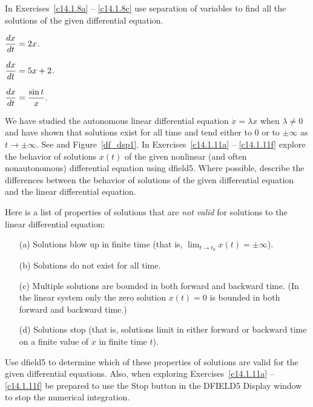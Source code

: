 \documentclass{ximera}
\begin{document}
\noindent In Exercises~\ref{c14.1.8a} -- \ref{c14.1.8c} use separation 
of variables to find all the solutions of the given differential equation.
\begin{exercise}  \label{c14.1.8a}
$\displaystyle \frac{dx}{dt} = 2x$.
\end{exercise}
\begin{exercise}  \label{c14.1.8b}
$\displaystyle \frac{dx}{dt} = 5x+2$.
\end{exercise}
\begin{exercise}  \label{c14.1.8c}
$\displaystyle \frac{dx}{dt} = \frac{\sin t}{x}$.
\end{exercise}

\CEXER

\noindent We have studied the autonomous linear differential equation 
$\dot{x}=\lambda x$ when $\lambda\neq 0$ and have shown that solutions 
exist for all time and tend either to $0$ or to $\pm\infty$ as $t\to\pm\infty$.
See  and Figure~\ref{df_dsp1}.  In Exercises~\ref{c14.1.11a} -- 
\ref{c14.1.11f} explore the behavior of solutions $x(t)$ of the given 
nonlinear (and often nonautonomous) differential equation using {\sf dfield5}.  
Where possible, describe the differences between the behavior of solutions of 
the given differential equation and the linear differential equation.  

  Here is a list of properties of solutions that are 
{\em not valid\/} for solutions to the linear differential equation:
\begin{itemize}
\item[(a)]  Solutions blow up in finite time (that is, 
$\lim_{t\to t_0}x(t)=\pm\infty$).
\item[(b)]  Solutions do not exist for all time.
\item[(c)]  Multiple solutions are bounded in both forward and backward time.
(In the linear system only the zero solution $x(t)=0$ is bounded in both 
forward and backward time.)
\item[(d)]  Solutions stop (that is, solutions limit in either forward or 
backward time on a finite value of $x$ in finite time $t$).
\end{itemize}
Use {\sf dfield5} to determine which of these properties of solutions are 
valid for the given differential equations.  Also, when exploring 
Exercises~\ref{c14.1.11a} -- \ref{c14.1.11f} be prepared to use the {\sf Stop}
button in the {\sf DFIELD5 Display} window to stop the numerical integration. 
\end{document}
